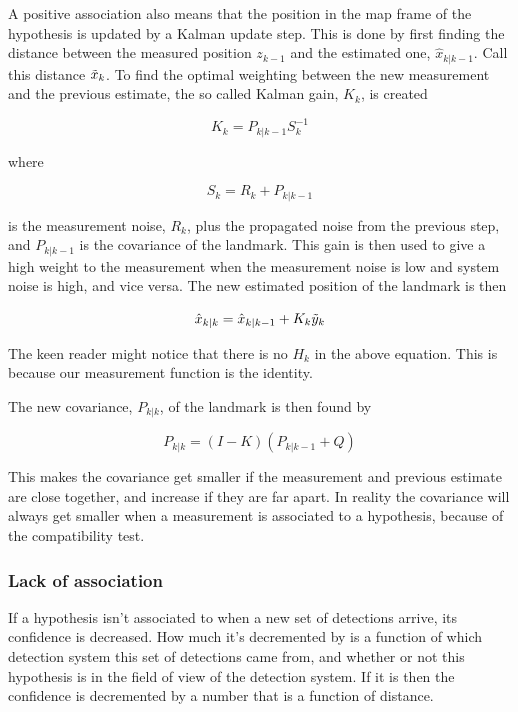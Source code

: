 A positive association also means that the position in the map frame of the hypothesis is updated by a Kalman update step. This is done by first finding the distance between the measured position $z_{k-1}$ and the estimated one, $\hat{x}_{k|k-1}$. Call this distance $\Tilde{x}_k$. To find the optimal weighting between the new measurement and the previous estimate, the so called Kalman gain, $K_k$, is created

\begin{equation}
    K_k = P_{k|k-1}S^{-1}_k
\end{equation}

where 

\begin{equation}
    S_k = R_k + P_{k|k-1}
\end{equation}

is the measurement noise, $R_k$, plus the propagated noise from the previous step, and $P_{k|k-1}$ is the covariance of the landmark. This gain is then used to give a high weight to the measurement when the measurement noise is low and system noise is high, and vice versa. The new estimated position of the landmark is then

\begin{equation}
    \hat{x}_{k|k} = \hat{x}_{k|k-1} + K_k\Tilde{y}_k
\end{equation}

The keen reader might notice that there is no $H_k$ in the above equation. This is because our measurement function is the identity. 

The new covariance, $P_{k|k}$, of the landmark is then found by  

\begin{equation}
    P_{k|k} = (I-K)(P_{k|k-1} + Q)
\end{equation}

This makes the covariance get smaller if the measurement and previous estimate are close together, and increase if they are far apart. In reality the covariance will always get smaller when a measurement is associated to a hypothesis, because of the compatibility test. 

\subsubsection{Lack of association}

If a hypothesis isn't associated to when a new set of detections arrive, its confidence is decreased. How much it's decremented by is a function of which detection system this set of detections came from, and whether or not this hypothesis is in the field of view of the detection system. If it is then the confidence is decremented by a number that is a function of distance. 

